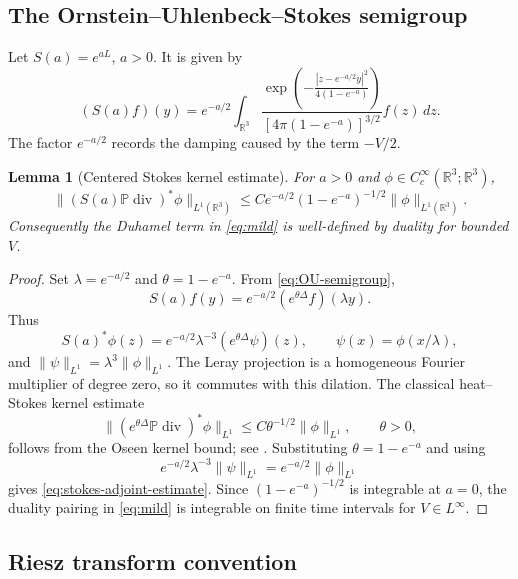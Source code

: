 \documentclass[11pt]{amsart}
\theoremstyle{plain}
\newtheorem{lemma}[theorem]{Lemma}
\theoremstyle{definition}
\theoremstyle{remark}
\numberwithin{equation}{section}
\newcommand{\R}{\mathbb R}
\newcommand{\divergence}{\operatorname{div}}
\begin{document}
\subsection{The Ornstein--Uhlenbeck--Stokes semigroup}

Let \(S(a)=e^{aL}\), \(a>0\).  It is given by
\begin{equation}\label{eq:OU-semigroup}
   (S(a)f)(y)
   =
   e^{-a/2}
   \int_{\R^3}
   \frac{\exp\!\left(-\frac{|z-e^{-a/2}y|^2}{4(1-e^{-a})}\right)}
        {[4\pi(1-e^{-a})]^{3/2}}
   f(z)\,dz .
\end{equation}
The factor \(e^{-a/2}\) records the damping caused by the term \(-V/2\).

\begin{lemma}[Centered Stokes kernel estimate]\label{lem:centered-stokes-kernel}
For \(a>0\) and \(\phi\in C_c^\infty(\R^3;\R^3)\),
\begin{equation}\label{eq:stokes-adjoint-estimate}
   \|(S(a)\mathbb P\divergence)^*\phi\|_{L^1(\R^3)}
   \le
   C e^{-a/2}(1-e^{-a})^{-1/2}\|\phi\|_{L^1(\R^3)}.
\end{equation}
Consequently the Duhamel term in \eqref{eq:mild} is well-defined by duality
for bounded \(V\).
\end{lemma}

\begin{proof}
Set \(\lambda=e^{-a/2}\) and \(\theta=1-e^{-a}\).  From
\eqref{eq:OU-semigroup},
\[
   S(a)f(y)=e^{-a/2}(e^{\theta\Delta}f)(\lambda y).
\]
Thus
\[
   S(a)^*\phi(z)
   =
   e^{-a/2}\lambda^{-3}
   (e^{\theta\Delta}\psi)(z),
   \qquad
   \psi(x)=\phi(x/\lambda),
\]
and \(\|\psi\|_{L^1}=\lambda^3\|\phi\|_{L^1}\).  The Leray projection is a
homogeneous Fourier multiplier of degree zero, so it commutes with this
dilation.  The classical heat--Stokes kernel estimate
\[
   \|(e^{\theta\Delta}\mathbb P\divergence)^*\phi\|_{L^1}
   \le C\theta^{-1/2}\|\phi\|_{L^1},
   \qquad \theta>0,
\]
follows from the Oseen kernel bound; see
\cite{FabesJonesRiviere1972,GigaMiyakawa1985,Sohr2001}.  Substituting
\(\theta=1-e^{-a}\) and using
\[
   e^{-a/2}\lambda^{-3}\|\psi\|_{L^1}=e^{-a/2}\|\phi\|_{L^1}
\]
gives \eqref{eq:stokes-adjoint-estimate}.  Since
\((1-e^{-a})^{-1/2}\) is integrable at \(a=0\), the duality pairing in
\eqref{eq:mild} is integrable on finite time intervals for
\(V\in L^\infty\).
\end{proof}

\subsection{Riesz transform convention}
\end{document}
